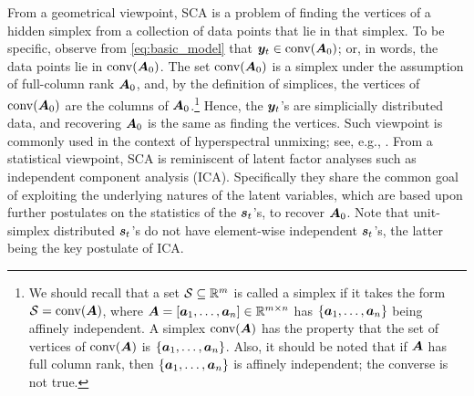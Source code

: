 \documentclass[10pt,twocolumn,twoside]{IEEEtran}
\def\blue{\color{blue}}
\begin{document}
From a geometrical viewpoint, SCA is a problem of finding the vertices of a hidden simplex from a collection of data points that lie in that simplex.
To be specific, observe from \eqref{eq:basic_model} that ${\bm y}_t \in {\rm conv}({\bm A}_0)$;
or, in words, the data points lie in ${\rm conv}({\bm A}_0)$.
The set ${\rm conv}({\bm A}_0)$ is a simplex under the assumption of full-column rank ${\bm A}_0$, and, by the definition of simplices, the vertices of ${\rm conv}({\bm A}_0)$ are the columns of $ {\bm A}_0$.\footnote{We should recall that a set $ \mathcal{S} \subseteq \mathbb{R}^{m} $ is called a simplex if it takes the form $ \mathcal{S} = {\rm conv}({\bm A}) $, where $ {\bm A} =[{\bm a}_1,\ldots,{\bm a}_n] \in \mathbb{R}^{m\times n} $ has $ \{{\bm a}_1,\ldots,{\bm a}_n\} $ being affinely independent. A simplex $ {\rm conv}({\bm A}) $ has the property that the set of vertices of $ {\rm conv}({\bm A}) $ is $ \{{\bm a}_1,\ldots,{\bm a}_n\} $.
	Also, it should be noted that if $ {\bm A} $ has full column rank, then $ \{{\bm a}_1,\ldots,{\bm a}_n\} $ is affinely independent; the converse is not true.}
Hence, the ${\bm y}_t$'s are simplicially distributed data, and recovering ${\bm A}_0$ is the same as finding the vertices.
Such viewpoint is commonly used in the context of hyperspectral unmixing; see, e.g., \cite{Jose12,Ma2014HU}.
From a statistical viewpoint, SCA is reminiscent of latent factor analyses such as independent component analysis (ICA).
Specifically they share the common goal of exploiting the underlying natures of the latent variables, which are based upon further postulates on the statistics of the ${\bm s}_t$'s, to recover ${\bm A}_0$.
Note that unit-simplex distributed ${\bm s}_t$'s do not have element-wise independent ${\bm s}_t$'s, the latter being the key postulate of ICA.

\end{document}
